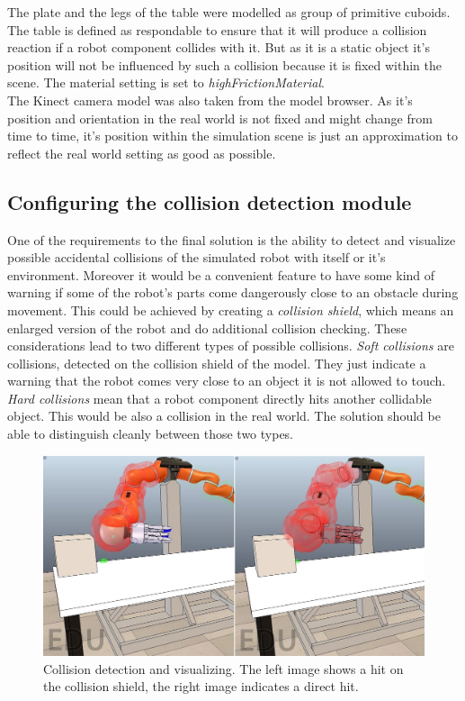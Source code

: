 The plate and the legs of the table were modelled as group of primitive cuboids. The table is defined as respondable to ensure that it will produce a collision reaction if a robot component collides with it. But as it is a static object it's position will not be influenced by such a collision because it is fixed within the scene. The material setting is set to \emph{highFrictionMaterial}. \\

The Kinect camera model was also taken from the model browser. As it's position and orientation in the real world is not fixed and might change from time to time, it's position within the simulation scene is just an approximation to reflect the real world setting as good as possible. 

\subsection{Configuring the collision detection module}

One of the requirements to the final solution is the ability to detect and visualize possible accidental collisions of the simulated robot with itself or it's environment. Moreover it would be a convenient feature to have some kind of warning if some of the robot's parts come dangerously close to an obstacle during movement. This could be achieved by creating a \emph{collision shield}, which means an enlarged version of the robot and do additional collision checking. These considerations lead to two different types of possible collisions. \emph{Soft collisions} are collisions, detected on the collision shield of the model. They just indicate a warning that the robot comes very close to an object it is not allowed to touch. \emph{Hard collisions} mean that a robot component directly hits another collidable object. This would be also a collision in the real world. The solution should be able to distinguish cleanly between those two types.\\ 

\begin{figure}[hb]
	\centering
  	\includegraphics[width=1.0\textwidth]{images/collision.jpg}
	\caption{Collision detection and visualizing. The left image shows a hit on the collision shield, the right image indicates a direct hit.}
	\label{fig:collision}
\end{figure}

